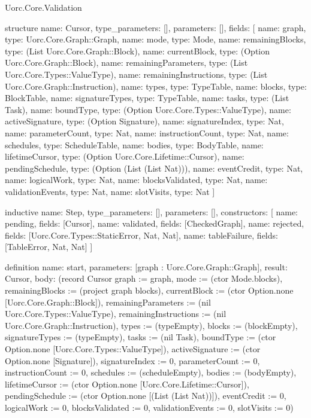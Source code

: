 \begin{lexlean}{Uorc.Core.Validation}
\begin{semanticmodule}
structure{
  name: Cursor,
  type_parameters: [],
  parameters: [],
  fields: [
    {name: graph, type: Uorc.Core.Graph::Graph},
    {name: mode, type: Mode},
    {name: remainingBlocks, type: (List Uorc.Core.Graph::Block)},
    {name: currentBlock, type: (Option Uorc.Core.Graph::Block)},
    {name: remainingParameters, type: (List Uorc.Core.Types::ValueType)},
    {name: remainingInstructions, type: (List Uorc.Core.Graph::Instruction)},
    {name: types, type: TypeTable},
    {name: blocks, type: BlockTable},
    {name: signatureTypes, type: TypeTable},
    {name: tasks, type: (List Task)},
    {name: boundType, type: (Option Uorc.Core.Types::ValueType)},
    {name: activeSignature, type: (Option Signature)},
    {name: signatureIndex, type: Nat},
    {name: parameterCount, type: Nat},
    {name: instructionCount, type: Nat},
    {name: schedules, type: ScheduleTable},
    {name: bodies, type: BodyTable},
    {name: lifetimeCursor, type: (Option Uorc.Core.Lifetime::Cursor)},
    {name: pendingSchedule, type: (Option (List (List Nat)))},
    {name: eventCredit, type: Nat},
    {name: logicalWork, type: Nat},
    {name: blocksValidated, type: Nat},
    {name: validationEvents, type: Nat},
    {name: slotVisits, type: Nat}
  ]
}

inductive{
  name: Step,
  type_parameters: [],
  parameters: [],
  constructors: [
    {name: pending, fields: [Cursor]},
    {name: validated, fields: [CheckedGraph]},
    {name: rejected, fields: [Uorc.Core.Types::StaticError, Nat, Nat]},
    {name: tableFailure, fields: [TableError, Nat, Nat]}
  ]
}

definition{
  name: start,
  parameters: [graph : Uorc.Core.Graph::Graph],
  result: Cursor,
  body: (record Cursor {graph := graph, mode := (ctor Mode.blocks), remainingBlocks := (project graph blocks), currentBlock := (ctor Option.none [Uorc.Core.Graph::Block]), remainingParameters := (nil Uorc.Core.Types::ValueType), remainingInstructions := (nil Uorc.Core.Graph::Instruction), types := (typeEmpty), blocks := (blockEmpty), signatureTypes := (typeEmpty), tasks := (nil Task), boundType := (ctor Option.none [Uorc.Core.Types::ValueType]), activeSignature := (ctor Option.none [Signature]), signatureIndex := 0, parameterCount := 0, instructionCount := 0, schedules := (scheduleEmpty), bodies := (bodyEmpty), lifetimeCursor := (ctor Option.none [Uorc.Core.Lifetime::Cursor]), pendingSchedule := (ctor Option.none [(List (List Nat))]), eventCredit := 0, logicalWork := 0, blocksValidated := 0, validationEvents := 0, slotVisits := 0})
}


\end{semanticmodule}
\end{lexlean}
